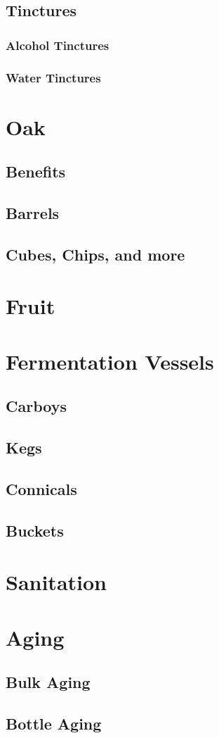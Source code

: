 \documentclass{article}
\begin{document}
 \subsection{Tinctures}
  \subsubsection{Alcohol Tinctures}
  \subsubsection{Water Tinctures}

\section{Oak}
 \subsection{Benefits}
 \subsection{Barrels}
 \subsection{Cubes, Chips, and more}

\section{Fruit}

\section{Fermentation Vessels}
 \subsection{Carboys}
 \subsection{Kegs}
 \subsection{Connicals}
 \subsection{Buckets}

\section{Sanitation}

\section{Aging}
 \subsection{Bulk Aging}
 \subsection{Bottle Aging}
\end{document}
